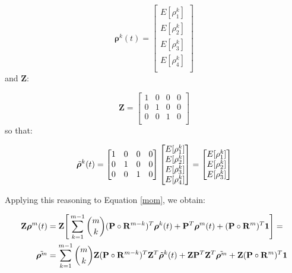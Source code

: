 \documentclass[\main/main.tex]{subfiles}
\begin{document}
\begin{equation}
\bm{\rho}^k(t) =
\begin{bmatrix}
E[\rho^k_1]\\
E[\rho^k_2]\\
E[\rho^k_{3}]\\
E[\rho^k_{4}]\\
\end{bmatrix}
\end{equation}
and $\mathbf{Z}$:

\begin{equation}
\mathbf{Z}=
    \begin{bmatrix}
   1 & 0 & 0 & 0\\
    0 & 1 & 0 & 0\\
     0 & 0 & 1 & 0\\
    \end{bmatrix}
\end{equation}
so that:

\begin{equation}
\Tilde{\bm{\rho}}^k(t) =
    \begin{bmatrix}
   1 & 0 & 0 & 0\\
    0 & 1 & 0 & 0\\
     0 & 0 & 1 & 0\\
    \end{bmatrix}
    \begin{bmatrix}
E[\rho^k_1]\\
E[\rho^k_2]\\
E[\rho^k_{3}]\\
E[\rho^k_{4}]\\
\end{bmatrix} = 
\begin{bmatrix}
E[\rho^k_1]\\
E[\rho^k_2]\\
E[\rho^k_{3}]\\
\end{bmatrix}
\end{equation}


Applying this reasoning to Equation \ref{mom}, we obtain:







\begin{equation}\label{mom2}
\begin{split}
     \mathbf{Z}\bm{\rho}^m(t) &= \mathbf{Z} \Bigg[ 
     \sum_{k=1}^{m-1} {m \choose k} (\mathbf{P} \circ \mathbf{R}^{m-k}) ^ T \bm{\rho}^k(t) +
     \mathbf{P} ^ T \bm{\rho}^m(t) + (\mathbf{P} \circ \mathbf{R}^{m}) ^ T \bm{1}\Bigg] = \\
     \Tilde{\bm{\rho}^m} &= \sum_{k=1}^{m-1} {m \choose k}\mathbf{Z}  (\mathbf{P} \circ \mathbf{R}^{m-k}) ^ T\mathbf{Z}^T \Tilde{\bm{\rho}}^k(t) + \mathbf{Z} \mathbf{P}^T \mathbf{Z}^T \Tilde{\bm{\rho}^m}  + \mathbf{Z} (\mathbf{P} \circ \mathbf{R}^{m}) ^ T \bm{1}
\end{split}
    \end{equation}
    
\end{document}
